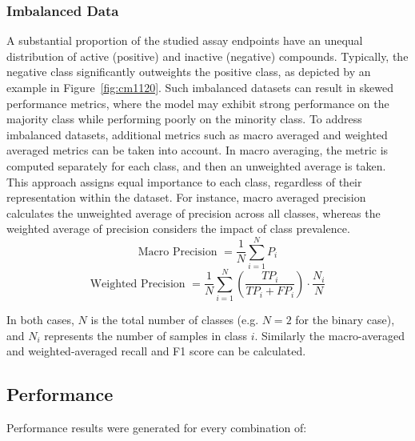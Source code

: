 \subsubsection{Imbalanced Data}
A substantial proportion of the studied assay endpoints have an unequal distribution of active (positive) and inactive (negative) compounds. Typically, the negative class significantly outweights the positive class, as depicted by an example in Figure~\ref{fig:cm1120}. Such imbalanced datasets can result in skewed performance metrics, where the model may exhibit strong performance on the majority class while performing poorly on the minority class. To address imbalanced datasets, additional metrics such as macro averaged and weighted averaged metrics can be taken into account.
In macro averaging, the metric is computed separately for each class, and then an unweighted average is taken. This approach assigns equal importance to each class, regardless of their representation within the dataset. For instance, macro averaged precision calculates the unweighted average of precision across all classes, whereas the weighted average of precision considers the impact of class prevalence.
\[ \text{Macro Precision } = \frac{1}{N} \sum_{i=1}^{N} P_i \] 
\[ \text{Weighted Precision } = \frac{1}{N} \sum_{i=1}^{N} \left(\frac{TP_i}{TP_i + FP_i}\right) \cdot \frac{N_i}{N} \]

In both cases, $N$ is the total number of classes (e.g. $N=2$ for the binary case), and $N_i$ represents the number of samples in class $i$. Similarly the macro-averaged and weighted-averaged recall and F1 score can be calculated.


\subsection{Performance}\label{sec:performance}

Performance results were generated for every combination of:

